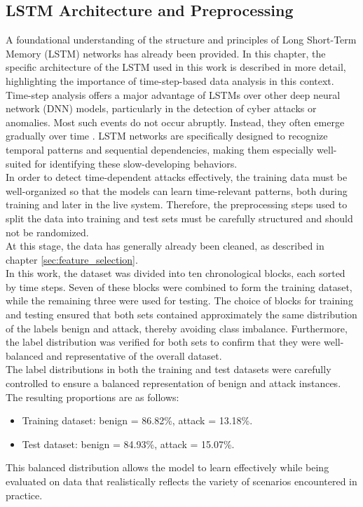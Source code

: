 \subsection{LSTM Architecture and Preprocessing}
\label{subsec:lstm_architecture_and_preprocessing}

A foundational understanding of the structure and principles of Long Short-Term Memory (LSTM) networks has already been provided. In this chapter, the specific architecture of the LSTM used in this work is described in more detail, highlighting the importance of time-step-based data analysis in this context.\\

Time-step analysis offers a major advantage of LSTMs over other deep neural network (DNN) models, particularly in the detection of cyber attacks or anomalies. Most such events do not occur abruptly. Instead, they often emerge gradually over time \cite{attack_over_time}. LSTM networks are specifically designed to recognize temporal patterns and sequential dependencies, making them especially well-suited for identifying these slow-developing behaviors.\\

In order to detect time-dependent attacks effectively, the training data must be well-organized so that the models can learn time-relevant patterns, both during training and later in the live system. Therefore, the preprocessing steps used to split the data into training and test sets must be carefully structured and should not be randomized.\\
At this stage, the data has generally already been cleaned, as described in chapter \ref{sec:feature_selection}.\\
In this work, the dataset was divided into ten chronological blocks, each sorted by time steps. Seven of these blocks were combined to form the training dataset, while the remaining three were used for testing. The choice of blocks for training and testing ensured that both sets contained approximately the same distribution of the labels benign and attack, thereby avoiding class imbalance. Furthermore, the label distribution was verified for both sets to confirm that they were well-balanced and representative of the overall dataset.\\

The label distributions in both the training and test datasets were carefully controlled to ensure a balanced representation of benign and attack instances. The resulting proportions are as follows:

\begin{itemize}
    \item Training dataset: benign = 86.82\%, attack = 13.18\%.
    \item Test dataset: benign = 84.93\%, attack = 15.07\%.
\end{itemize}

This balanced distribution allows the model to learn effectively while being evaluated on data that realistically reflects the variety of scenarios encountered in practice.